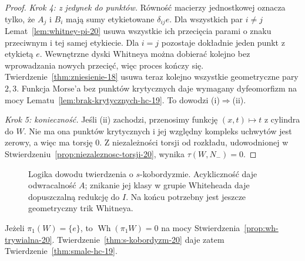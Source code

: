 \begin{proof}
\emph{Krok 4: z jedynek do punktów.}
Równość macierzy jednostkowej oznacza tylko,
że $A_j$ i $B_i$ mają sumy etykietowane
$\delta_{ij}e$. Dla wszystkich par $i\ne j$
Lemat~\ref{lem:whitney-pi-20} usuwa
wszystkie ich przecięcia parami o znaku
przeciwnym i tej samej etykiecie.
Dla $i=j$ pozostaje dokładnie jeden punkt
z etykietą $e$. Wewnętrzne dyski Whitneya
można dobierać kolejno bez wprowadzania
nowych przecięć, więc proces kończy się.
Twierdzenie~\ref{thm:zniesienie-18}
usuwa teraz kolejno wszystkie geometryczne
pary $2,3$. Funkcja Morse'a bez punktów
krytycznych daje wymagany dyfeomorfizm
na mocy Lematu~\ref{lem:brak-krytycznych-hc-19}.
To dowodzi (i)$\Rightarrow$(ii).

\emph{Krok 5: konieczność.}
Jeśli (ii) zachodzi, przenosimy funkcję
$(x,t)\mapsto t$ z cylindra do $W$.
Nie ma ona punktów krytycznych i jej
względny kompleks uchwytów jest zerowy,
a więc ma torsję $0$. Z niezależności
torsji od rozkładu, udowodnionej w
Stwierdzeniu~\ref{prop:niezaleznosc-torsji-20},
wynika $\tau(W,N_-)=0$.
\end{proof}

\begin{figure}[htbp]
\centering
{}
\caption{Logika dowodu twierdzenia o $s$-kobordyzmie.
Acykliczność daje odwracalność $A$; znikanie jej klasy
w grupie Whiteheada daje dopuszczalną redukcję do $I$.
Na końcu potrzebny jest jeszcze geometryczny trik Whitneya.}
\label{fig:dowod-s-kobordyzm-20}
\end{figure}

\begin{wniosek}
Jeżeli $\pi_1(W)=\{e\}$, to
$\operatorname{Wh}(\pi_1W)=0$ na mocy
Stwierdzenia~\ref{prop:wh-trywialna-20}.
Twierdzenie~\ref{thm:s-kobordyzm-20}
daje zatem Twierdzenie~\ref{thm:smale-hc-19}.
\end{wniosek}

